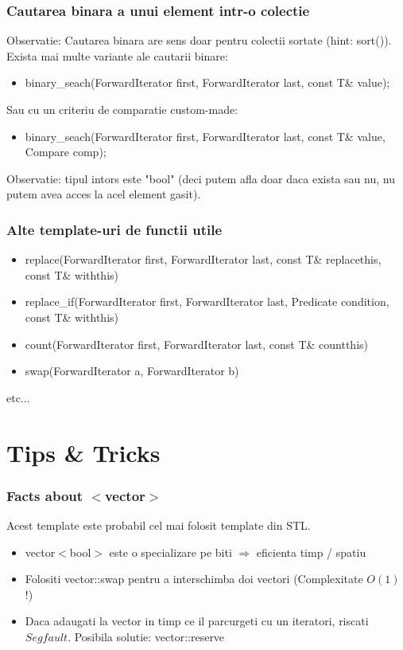 \documentclass{beamer}
\begin{document}
  \begin{frame}
  \frametitle{Cautarea binara a unui element intr-o colectie}
  Observatie: Cautarea binara are sens doar pentru colectii sortate (hint: sort()).
  \pause
  Exista mai multe variante ale cautarii binare:
  \begin{itemize}
  \pause \item binary\_seach(ForwardIterator first, ForwardIterator last, const T\& value); 
  \end{itemize}
  \pause
  Sau cu un criteriu de comparatie custom-made:
  \begin{itemize}
  \pause \item binary\_seach(ForwardIterator first, ForwardIterator last, const T\& value, Compare comp); 
  \end{itemize}
  \pause Observatie: tipul intors este "bool" (deci putem afla doar daca exista sau nu, nu putem avea acces la acel element gasit).
  \end{frame}

  \begin{frame}
  \frametitle{Alte template-uri de functii utile}
  \begin{itemize}
  \item replace(ForwardIterator first, ForwardIterator last, const T\& replacethis, const T\& withthis)
  \item replace\_if(ForwardIterator first, ForwardIterator last, Predicate condition, const T\& withthis)
  \item count(ForwardIterator first, ForwardIterator last, const T\& countthis)
  \item swap(ForwardIterator a, ForwardIterator b)
  \end{itemize}
  etc...
  \end{frame}

\section{Tips \& Tricks}

  \frame{\tableofcontents[currentsection]}

  \begin{frame}
  \frametitle{Facts about $<$vector$>$}
  Acest template este probabil cel mai folosit template din STL.
  \begin{itemize}
  \pause \item vector$<$bool$>$ este o specializare pe biti $\Rightarrow$ eficienta timp / spatiu
  \pause \item Folositi vector::swap pentru a interschimba doi vectori (Complexitate $O(1)$ !)
  \pause \item Daca adaugati la vector in timp ce il parcurgeti cu un iteratori, riscati $Segfault$. Posibila solutie: vector::reserve
  \end{itemize}
  \end{frame}
\end{document}
